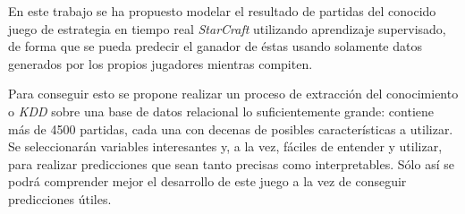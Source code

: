 





En este trabajo se ha propuesto modelar el resultado de partidas del conocido
juego de estrategia en tiempo real \emph{StarCraft} utilizando aprendizaje
supervisado, de forma que se pueda predecir el ganador de éstas usando
solamente datos generados por los propios jugadores mientras compiten.

Para conseguir esto se propone realizar un proceso de extracción del
conocimiento o \emph{KDD} sobre una base de datos relacional lo suficientemente
grande: contiene más de 4500 partidas, cada una con decenas de posibles
características a utilizar. Se seleccionarán variables interesantes y, a la vez,
fáciles de entender y utilizar, para realizar predicciones que sean tanto
precisas como interpretables. Sólo así se podrá comprender mejor el desarrollo
de este juego a la vez de conseguir predicciones útiles.

